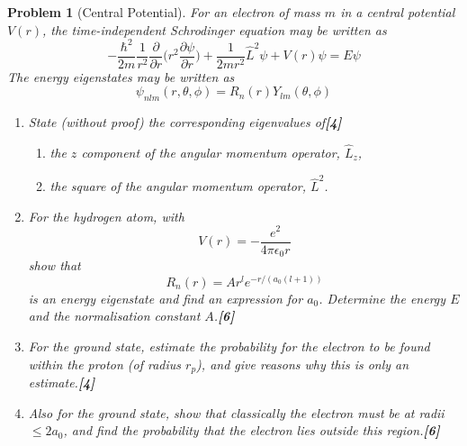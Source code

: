 \documentclass[a4paper]{article}
\theoremstyle{new}
\newtheorem{qns}{Problem}[subsection]
\begin{document}
\begin{qns}[Central Potential]
For an electron of mass $m$ in a central potential $V(r)$, the time-independent Schrodinger equation may be written as
$$-\frac{\hbar^2}{2m}\frac{1}{r^2}\frac{\partial}{\partial r}\bigg(r^2\frac{\partial\psi}{\partial r}\bigg)+\frac{1}{2mr^2}\hat{L}^2\psi+V(r)\psi=E\psi$$
The energy eigenstates may be written as
$$\psi_{nlm}(r,\theta,\phi)=R_n(r)Y_{lm}(\theta,\phi)$$
\begin{enumerate}[label=(\roman*)]
\item State (without proof) the corresponding eigenvalues of\hfill\textbf{[4]}
\begin{enumerate}[label=(\alph*)]
    \item the $z$ component of the angular momentum operator, $\hat{L}_z$,
    \item the square of the angular momentum operator, $\hat{L}^2$.
\end{enumerate}
\item For the hydrogen atom, with
$$V(r)=-\frac{e^2}{4\pi\epsilon_0r}$$
show that
$$R_n(r)=Ar^le^{-r/(a_0(l+1))}$$
is an energy eigenstate and find an expression for $a_0$. Determine the energy $E$ and the normalisation constant $A$.\hfill\textbf{[6]}
\item For the ground state, estimate the probability for the electron to be found within the proton (of radius $r_p$), and give reasons why this is only an estimate.\hfill\textbf{[4]}
\item Also for the ground state, show that classically the electron must be at radii $\leq 2a_0$, and find the probability that the electron lies outside this region.\hfill\textbf{[6]}
\end{enumerate}
\begin{mdframed}
\end{mdframed}
\end{qns}
\end{document}
